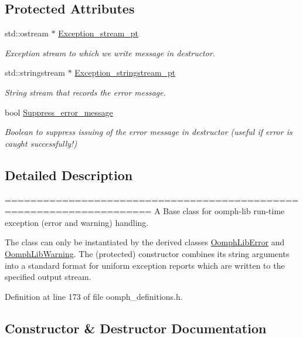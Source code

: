 \subsection*{Protected Attributes}
\begin{DoxyCompactItemize}
\item 
std\+::ostream $\ast$ \hyperlink{classoomph_1_1OomphLibException_ab9177b3f4d969f3e4d102487165103c7}{Exception\+\_\+stream\+\_\+pt}
\begin{DoxyCompactList}\small\item\em Exception stream to which we write message in destructor. \end{DoxyCompactList}\item 
std\+::stringstream $\ast$ \hyperlink{classoomph_1_1OomphLibException_a94df333a8bdcb4b89eeb516a64a3429e}{Exception\+\_\+stringstream\+\_\+pt}
\begin{DoxyCompactList}\small\item\em String stream that records the error message. \end{DoxyCompactList}\item 
bool \hyperlink{classoomph_1_1OomphLibException_ac374cd3358bf26639860a6778779786d}{Suppress\+\_\+error\+\_\+message}
\begin{DoxyCompactList}\small\item\em Boolean to suppress issuing of the error message in destructor (useful if error is caught successfully!) \end{DoxyCompactList}\end{DoxyCompactItemize}


\subsection{Detailed Description}
===================================================================== A Base class for oomph-\/lib run-\/time exception (error and warning) handling.

The class can only be instantiated by the derived classes \hyperlink{classoomph_1_1OomphLibError}{Oomph\+Lib\+Error} and \hyperlink{classoomph_1_1OomphLibWarning}{Oomph\+Lib\+Warning}. The (protected) constructor combines its string arguments into a standard format for uniform exception reports which are written to the specified output stream. 

Definition at line 173 of file oomph\+\_\+definitions.\+h.



\subsection{Constructor \& Destructor Documentation}
\mbox{\label{classoomph_1_1OomphLibException_a2bcc47316fcc96608e79bec5ab49f82b}} 
